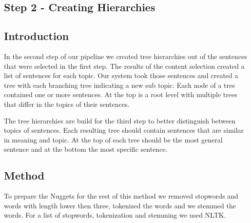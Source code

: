 



\newpage
\subsection{Step 2 - Creating Hierarchies}

\subsection{Introduction}

In the second step of our pipeline we created tree hierarchies out of the sentences that were selected in the first step. The results of the content selection created a list of sentences for each topic. Our system took those sentences and created a tree with each branching tree indicating a new sub topic. Each node of a tree contained one or more sentences. At the top is a root level with multiple trees that differ in the topics of their sentences. 

The tree hierarchies are build for the third step to better distinguish between topics of sentences. Each resulting tree should contain sentences that are similar in meaning and topic. At the top of each tree should be the most general sentence and at the bottom the most specific sentence.


\subsection{Method}

To prepare the Nuggets for the rest of this method we removed stopwords and words with length lower then three, tokenized the words and we stemmed the words. For a list of stopwords, tokenization and stemming we used NLTK.

